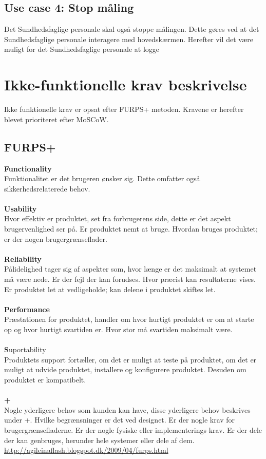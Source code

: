 \subsection{Use case 4: Stop måling}
Det Sundhedsfaglige personale skal også stoppe målingen. Dette gøres ved at det Sundhedsfaglige personale interagere med hovedskærmen. Herefter vil det være muligt for det Sundhedsfaglige personale at logge 
\section{Ikke-funktionelle krav beskrivelse}
Ikke funktionelle krav er opsat efter FURPS+ metoden. Kravene er herefter blevet prioriteret efter MoSCoW.
\subsection{FURPS+}
\textbf{Functionality}\\
Funktionalitet er det brugeren ønsker sig. Dette omfatter også sikkerhedsrelaterede behov.\\\\
\textbf{Usability}\\
Hvor effektiv er produktet, set fra forbrugerens side, dette er det aspekt brugervenlighed ser på. Er produktet nemt at bruge. Hvordan bruges produktet; er der nogen brugergrænseflader.\\\\
\textbf{Reliability}\\
Pålidelighed tager sig af aspekter som, hvor længe er det maksimalt at systemet må være nede. Er der fejl der kan forudses. Hvor præcist kan resultaterne vises. Er produktet let at vedligeholde; kan delene i produktet skiftes let.\\\\
\textbf{Performance}\\
Præstationen for produktet, handler om hvor hurtigt produktet er om at starte op og hvor hurtigt svartiden er. Hvor stor må svartiden maksimalt være. \\\\
\textbf{S}uportability\\
Produktets support fortæller, om det er muligt at teste på produktet, om det er muligt at udvide produktet, installere og konfigurere produktet. Desuden om produktet er kompatibelt.\\\\
\textbf{+}\\
Nogle yderligere behov som kunden kan have, disse yderligere behov beskrives under +. Hvilke begrænsninger er det ved designet. Er der nogle krav for brugergrænsefladerne. Er der nogle fysiske eller implementerings krav. Er der dele der kan genbruges, herunder hele systemer eller dele af dem.\\
\url{http://agileinaflash.blogspot.dk/2009/04/furps.html}

